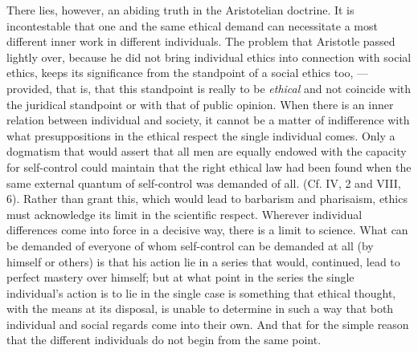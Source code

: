 \documentclass[12pt,a4paper,openany]{book}
\newcommand{\opage}[1]{\marginnote{\footnotesize\textit{[#1]}}}
\begin{document}
There lies, however, an abiding truth in the Aristotelian doctrine. It is incontestable that one and the same ethical
demand can necessitate a most different inner work in different individuals. The problem that Aristotle passed
lightly over, because he did not bring individual ethics into connection with social ethics, keeps its significance
from the standpoint of a social ethics too, --- provided, that is, that this standpoint is really to be
\textit{ethical} and not coincide with the juridical standpoint or with that of public opinion. When there is an
inner relation between individual and society, it cannot be a matter of indifference with what presuppositions in
the ethical respect the single individual comes. Only a dogmatism that would assert that all men are equally
endowed with the capacity for self-control could maintain that the right ethical law had been found when the same
external quantum of self-control was demanded of all. (Cf. IV, 2 and VIII, 6). Rather than grant this, which would
lead to barbarism and pharisaism, ethics must acknowledge its limit in the scientific respect. Wherever individual
differences come into force in a decisive way, there is a limit to science. What can be demanded of everyone of
whom self-control can be demanded at all (by himself or others) is that his action lie in a series that would,
continued, lead to perfect mastery over himself; but at what point in the series the single individual's action is
to lie in the single case is something that ethical
\opage{225}thought, with the means at its disposal, is unable to determine in such a way that both individual and
social regards come into their own. And that for the simple reason that the different individuals do not begin
from the same point.
\end{document}
